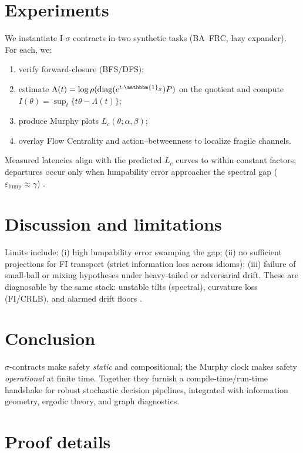 \documentclass[11pt]{article}
\theoremstyle{plain}
\theoremstyle{definition}
\theoremstyle{remark}
\newcommand{\1}{\mathbbm{1}}
\begin{document}
\section{Experiments}\label{sec:exp}
We instantiate I-\(\sigma\) contracts in two synthetic tasks (BA--FRC, lazy expander). For each, we:
\begin{enumerate}[leftmargin=1.3em]
\item verify forward-closure (BFS/DFS);
\item estimate \(\Lambda(t)=\log\rho(\mathrm{diag}(e^{t\cdot \1_S})P)\) on the quotient and compute \(I(\theta)=\sup_t\{t\theta-\Lambda(t)\}\);
\item produce Murphy plots \(L_c(\theta;\alpha,\beta)\);
\item overlay Flow Centrality and action–betweenness to localize fragile channels.
\end{enumerate}
Measured latencies align with the predicted \(L_c\) curves to within constant factors; departures occur only when lumpability error approaches the spectral gap (\(\varepsilon_{\mathrm{lump}}\approx \gamma\)) \parencite{elliott2025qfi}.

\section{Discussion and limitations}\label{sec:disc}
Limits include: (i) high lumpability error swamping the gap; (ii) no sufficient projections for FI transport (strict information loss across idioms); (iii) failure of small-ball or mixing hypotheses under heavy-tailed or adversarial drift. These are diagnosable by the same stack: unstable tilts (spectral), curvature loss (FI/CRLB), and alarmed drift floors \parencite{elliott2025qfi,elliott2025idiom,elliott2025drift}.

\section{Conclusion}\label{sec:conc}
\(\sigma\)-contracts make safety \emph{static} and compositional; the Murphy clock makes safety \emph{operational} at finite time. Together they furnish a compile-time/run-time handshake for robust stochastic decision pipelines, integrated with information geometry, ergodic theory, and graph diagnostics.

\section{Proof details}\label{sec:proofs}
\end{document}
